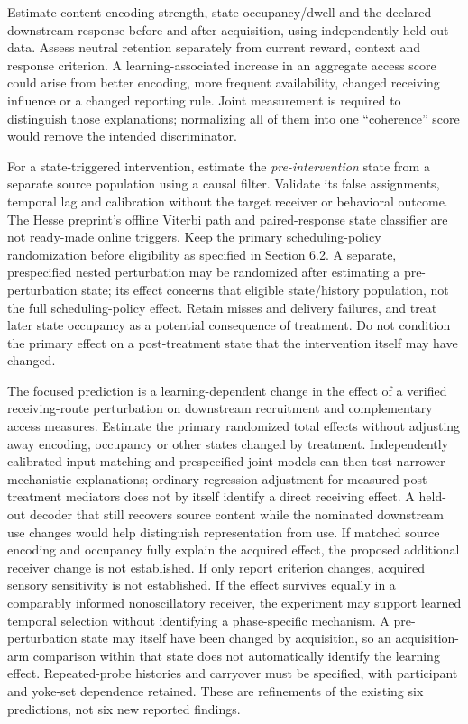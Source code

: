 \documentclass[
  american,
  11pt,
  letterpaper,
]{article}
\begin{document}
Estimate content-encoding strength, state occupancy/dwell and the declared downstream response before and after acquisition, using independently held-out data. Assess neutral retention separately from current reward, context and response criterion. A learning-associated increase in an aggregate access score could arise from better encoding, more frequent availability, changed receiving influence or a changed reporting rule. Joint measurement is required to distinguish those explanations; normalizing all of them into one ``coherence'' score would remove the intended discriminator.

For a state-triggered intervention, estimate the \emph{pre-intervention} state from a separate source population using a causal filter. Validate its false assignments, temporal lag and calibration without the target receiver or behavioral outcome. The Hesse preprint's offline Viterbi path and paired-response state classifier are not ready-made online triggers. Keep the primary scheduling-policy randomization before eligibility as specified in Section 6.2. A separate, prespecified nested perturbation may be randomized after estimating a pre-perturbation state; its effect concerns that eligible state/history population, not the full scheduling-policy effect. Retain misses and delivery failures, and treat later state occupancy as a potential consequence of treatment. Do not condition the primary effect on a post-treatment state that the intervention itself may have changed.

The focused prediction is a learning-dependent change in the effect of a verified receiving-route perturbation on downstream recruitment and complementary access measures. Estimate the primary randomized total effects without adjusting away encoding, occupancy or other states changed by treatment. Independently calibrated input matching and prespecified joint models can then test narrower mechanistic explanations; ordinary regression adjustment for measured post-treatment mediators does not by itself identify a direct receiving effect. A held-out decoder that still recovers source content while the nominated downstream use changes would help distinguish representation from use. If matched source encoding and occupancy fully explain the acquired effect, the proposed additional receiver change is not established. If only report criterion changes, acquired sensory sensitivity is not established. If the effect survives equally in a comparably informed nonoscillatory receiver, the experiment may support learned temporal selection without identifying a phase-specific mechanism. A pre-perturbation state may itself have been changed by acquisition, so an acquisition-arm comparison within that state does not automatically identify the learning effect. Repeated-probe histories and carryover must be specified, with participant and yoke-set dependence retained. These are refinements of the existing six predictions, not six new reported findings.
\end{document}
